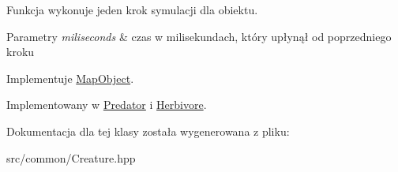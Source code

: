 Funkcja wykonuje jeden krok symulacji dla obiektu. 


\begin{DoxyParams}{Parametry}
{\em miliseconds} & czas w milisekundach, który upłynął od poprzedniego kroku \\
\hline
\end{DoxyParams}


Implementuje \hyperlink{classMapObject_a8bd8926db59af00a61b8860352abfdd9}{Map\-Object}.



Implementowany w \hyperlink{classPredator_a7d8004ead868419138c8782fb392a1b1}{Predator} i \hyperlink{classHerbivore_a728f136b4489a168df89dadd244a86a8}{Herbivore}.



Dokumentacja dla tej klasy została wygenerowana z pliku\-:\begin{DoxyCompactItemize}
\item 
src/common/Creature.\-hpp\end{DoxyCompactItemize}
